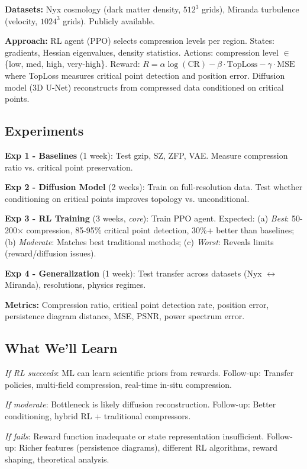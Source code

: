 \documentclass[11pt]{article}
\begin{document}
\textbf{Datasets:} Nyx cosmology (dark matter density, $512^3$ grids), Miranda turbulence (velocity, $1024^3$ grids). Publicly available.

\textbf{Approach:} RL agent (PPO) selects compression levels per region. States: gradients, Hessian eigenvalues, density statistics. Actions: compression level $\in$ \{low, med, high, very-high\}. Reward: $R = \alpha \log(\text{CR}) - \beta \cdot \text{TopLoss} - \gamma \cdot \text{MSE}$ where TopLoss measures critical point detection and position error. Diffusion model (3D U-Net) reconstructs from compressed data conditioned on critical points.

\subsection{Experiments}

\textbf{Exp 1 - Baselines} (1 week): Test gzip, SZ, ZFP, VAE. Measure compression ratio vs. critical point preservation.

\textbf{Exp 2 - Diffusion Model} (2 weeks): Train on full-resolution data. Test whether conditioning on critical points improves topology vs. unconditional.

\textbf{Exp 3 - RL Training} (3 weeks, \textit{core}): Train PPO agent. Expected: (a) \textit{Best}: 50-200$\times$ compression, 85-95\% critical point detection, 30\%+ better than baselines; (b) \textit{Moderate}: Matches best traditional methods; (c) \textit{Worst}: Reveals limits (reward/diffusion issues).

\textbf{Exp 4 - Generalization} (1 week): Test transfer across datasets (Nyx $\leftrightarrow$ Miranda), resolutions, physics regimes.

\textbf{Metrics:} Compression ratio, critical point detection rate, position error, persistence diagram distance, MSE, PSNR, power spectrum error.

\subsection{What We'll Learn}

\textit{If RL succeeds}: ML can learn scientific priors from rewards. Follow-up: Transfer policies, multi-field compression, real-time in-situ compression.

\textit{If moderate}: Bottleneck is likely diffusion reconstruction. Follow-up: Better conditioning, hybrid RL + traditional compressors.

\textit{If fails}: Reward function inadequate or state representation insufficient. Follow-up: Richer features (persistence diagrams), different RL algorithms, reward shaping, theoretical analysis.
\end{document}

